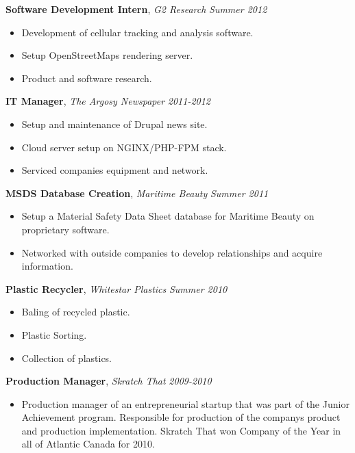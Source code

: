 \documentclass[9pt]{article}
\newenvironment{changemargin}[2]{%
  \begin{list}{}{%
    \setlength{\topsep}{0pt}%
    \setlength{\leftmargin}{#1}%
    \setlength{\rightmargin}{#2}%
    \setlength{\listparindent}{\parindent}%
    \setlength{\itemindent}{\parindent}%
    \setlength{\parsep}{\parskip}%
  }%
  \item[]}{\end{list}
}
\newenvironment{body} {
	\vspace*{-16pt}
	\begin{changemargin}{-0.25in}{-0.5in}
  }	
	{\end{changemargin}
}
\begin{document}
\begin{body}
\begin{body}
\begin{itemize}
	\end{itemize}
	\textbf{Software Development Intern}, \emph{G2 Research} \hfill \emph{Summer 2012}\\
	\vspace*{-4pt}
	\begin{itemize} \itemsep -0pt  %
		\item Development of cellular tracking and analysis software.
		\item Setup OpenStreetMaps rendering server.
		\item Product and software research.
	\end{itemize}

	\textbf {IT Manager}, \emph{The Argosy Newspaper} \hfill \emph{2011-2012}\\
	\vspace*{-4pt}
	\begin{itemize} \itemsep -0pt
		\item Setup and maintenance of Drupal news site.
		\item Cloud server setup on NGINX/PHP-FPM stack. 
		\item Serviced companies equipment and network. 
	\end{itemize}

	\textbf {MSDS Database Creation}, \emph{Maritime Beauty} \hfill \emph{Summer 2011}\\
	\vspace*{-4pt}
	\begin{itemize} \itemsep -0pt
		\item Setup a Material Safety Data Sheet database for Maritime Beauty on proprietary software. 
		\item Networked with outside companies to develop relationships and acquire information. 
	\end{itemize}

	\textbf {Plastic Recycler}, \emph{Whitestar Plastics} \hfill \emph{Summer 2010}\\
	\vspace*{-4pt}
	\begin{itemize} \itemsep -0pt
		\item Baling of recycled plastic.
		\item Plastic Sorting.
		\item Collection of plastics. 
	\end{itemize}

	\textbf {Production Manager}, \emph{Skratch That} \hfill \emph{2009-2010}\\
	\vspace*{-4pt}
	\begin{itemize} \itemsep -0pt
		\item Production manager of an entrepreneurial startup that was part of the Junior Achievement program.
Responsible for production of the companys product and production implementation. Skratch That won
Company of the Year in all of Atlantic Canada for 2010.
	\end{itemize}


\end{body}
\end{body}
\end{document}
